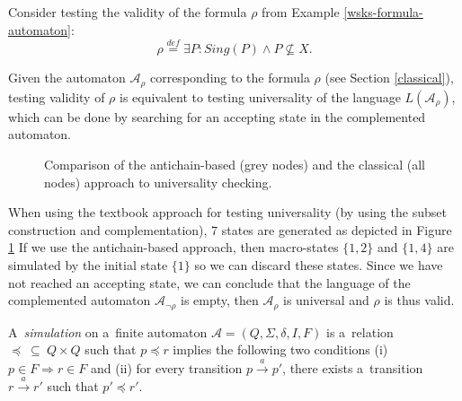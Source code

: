 \newpage
\noindent\hrulefill
\begin{example}
Consider testing the validity of the formula $\rho$ from Example
\ref{wsks-formula-automaton}:
  \begin{equation}
  \rho \overset{\mathit{def}}{=} \exists P:
 Sing(P) \wedge P \not\subseteq X.
  \end{equation}
  
Given the automaton $\mathcal{A}_\rho$ corresponding to the formula $\rho$
(see Section \ref{classical}), testing validity of $\rho$ is
equivalent to testing universality of the language $L(\mathcal{A}_\rho)$, which
can be done by searching for an accepting state in the complemented automaton.

\begin{figure}[h!]
 \begin{center}
 \end{center}
 \caption{Comparison of the antichain-based (grey nodes) and the classical (all
 nodes) approach to universality checking.}
 \label{compare}
\end{figure}

When using the textbook approach for testing universality (by using the subset
construction and complementation), 7 states are generated as depicted in Figure
\ref{compare} If we use the antichain-based approach, then macro-states $\{1,
2\}$ and $\{1, 4\}$ are simulated by the initial state $\{1\}$ so we can
discard these states.
Since we have not reached an accepting state, we can conclude that the
language of the complemented automaton $\mathcal{A}_{\neg\rho}$ is empty, then
$\mathcal{A}_\rho$ is universal and $\rho$ is thus valid.
\end{example}
\noindent\hrulefill

\begin{defz}
A~\emph{simulation} on a~finite automaton $\mathcal{A} = (Q, \Sigma, \delta, I,
F)$ is a~relation $\preceq~\subseteq~Q \times Q$ such that $p \preceq r$
implies the following two conditions (i) $p \in F \Rightarrow r \in F$ and (ii) for
every transition $p \overset{a}{\longrightarrow} p'$, there exists a~transition $r
\overset{a}{\longrightarrow} r'$ such that $p' \preceq r'$.
\end{defz}

